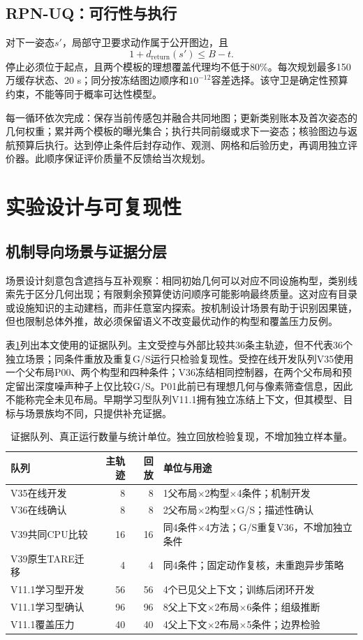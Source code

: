 \documentclass[11pt,a4paper]{article}
\begin{document}
\subsection{RPN-UQ：可行性与执行}
对下一姿态$s'$，局部守卫要求动作属于公开图边，且
\begin{equation}
1+d_{\mathrm{return}}(s')\le B-t.
\end{equation}
停止必须位于起点，且两个模板的理想覆盖代理均不低于80\%。每次规划最多150万缓存状态、20 s；同分按冻结图边顺序和$10^{-12}$容差选择。该守卫是确定性预算约束，不能等同于概率可达性模型。

每一循环依次完成：保存当前传感包并融合共同地图；更新类别账本及首次姿态的几何权重；累并两个模板的曝光集合；执行共同前缀或求下一姿态；核验图边与返航预算后执行。达到停止条件后封存动作、观测、网格和后验历史，再调用独立评价器。此顺序保证评价质量不反馈给当次规划。

\section{实验设计与可复现性}
\subsection{机制导向场景与证据分层}
场景设计刻意包含遮挡与互补观察：相同初始几何可以对应不同设施构型，类别线索先于区分几何出现；有限剩余预算使访问顺序可能影响最终质量。这对应有目录或设施知识的主动建档，而非任意室内探索。按机制设计场景有助于识别因果链，但也限制总体外推，故必须保留语义不改变最优动作的构型和覆盖压力反例。

表\ref{tab:cohorts}列出本文使用的证据队列。主文受控与外部比较共36条主轨迹，但不代表36个独立场景；同条件重放及重复G/S运行只检验复现性。受控在线开发队列V35使用一个父布局P00、两个构型和四种条件；V36冻结相同控制器，在两个父布局和预定留出深度噪声种子上仅比较G/S。P01此前已有理想几何与像素筛查信息，因此不能称完全未见布局。早期学习型队列V11.1拥有独立冻结上下文，但其模型、目标与场景族均不同，只提供补充证据。

\begin{table}[tb]
\centering\small
\caption{证据队列、真正运行数量与统计单位。独立回放检验复现，不增加独立样本量。}
\label{tab:cohorts}
\begin{tabular}{p{.24\linewidth}rrp{.37\linewidth}}
\toprule
队列 & 主轨迹 & 回放 & 单位与用途\\\midrule
V35在线开发 & 8 & 8 & 1父布局$\times$2构型$\times$4条件；机制开发\\
V36在线确认 & 8 & 8 & 2父布局$\times$2构型$\times$G/S；描述性确认\\
V39共同CPU比较 & 16 & 16 & 同4条件$\times$4方法；G/S重复V36，不增加独立条件\\
V39原生TARE迁移 & 4 & 4 & 同4条件；固定动作复核，未重跑异步策略\\
V11.1学习型开发 & 56 & 56 & 4个已见父上下文；训练后闭环开发\\
V11.1学习型确认 & 96 & 96 & 8父上下文$\times$2布局$\times$6条件；组级推断\\
V11.1覆盖压力 & 40 & 40 & 4父上下文$\times$2布局$\times$5条件；边界检验\\\bottomrule
\end{tabular}
\end{table}
\end{document}
